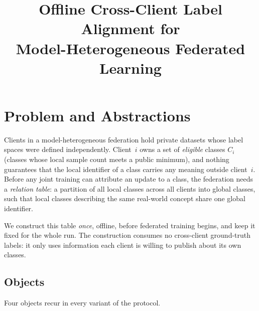 \documentclass[conference]{IEEEtran}
\begin{document}
\title{Offline Cross-Client Label Alignment for\\Model-Heterogeneous Federated Learning}
\author{}
\maketitle

\section{Problem and Abstractions}
\label{sec:abstraction}

Clients in a model-heterogeneous federation hold private datasets whose
label spaces were defined independently. Client~$i$ owns a set of
\emph{eligible} classes $C_i$ (classes whose local sample count meets a
public minimum), and nothing guarantees that the local identifier of a
class carries any meaning outside client~$i$. Before any joint training
can attribute an update to a class, the federation needs a
\emph{relation table}: a partition of all local classes across all
clients into global classes, such that local classes describing the same
real-world concept share one global identifier.

We construct this table \emph{once}, offline, before federated training
begins, and keep it fixed for the whole run. The construction consumes
no cross-client ground-truth labels: it only uses information each
client is willing to publish about its own classes.

\subsection*{Objects}
Four objects recur in every variant of the protocol.
\end{document}
